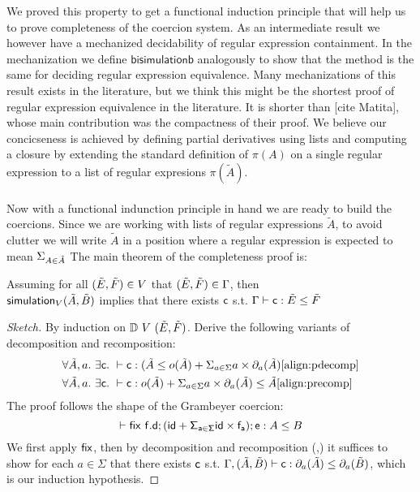 We proved this property to get a functional induction principle that will help us to prove completeness of the coercion system. As an intermediate result we however have a mechanized decidability of regular expression containment. In the mechanization we define $\mathsf{bisimulationb}$ analogously to show that the method is the same for deciding regular expression equivalence. Many mechanizations of this result exists in the literature, but we think this might be the shortest proof of regular expression equivalence in the literature. It is shorter than [cite Matita], whose main contribution was the compactness of their proof. We believe our concicseness is achieved by defining partial derivatives using lists and computing a closure by extending the standard definition of $\pi(A)$ on a single regular expression to a list of regular expresions $\pi(\tilde{A})$.\\\\
Now with a functional indunction principle in hand we are ready to build the coercions. Since we are working with lists of regular expressions $\tilde{A}$, to avoid clutter we will write $\tilde{A}$ in a position where a regular expression is expected to mean $\Sigma_{A \in \tilde{A}}$ The main theorem of the completeness proof is:
\begin{theorem}
Assuming for all $(\tilde{E},\tilde{F}) \in V$ that $(\tilde{E},\tilde{F}) \in \Gamma$, then\\
$\mathsf{simulation}_{V}(\tilde{A},\tilde{B})$ implies that there exists $\mathsf{c}$ s.t. $\Gamma \vdash \mathsf{c} : \tilde{E} \leq \tilde{F}$
\end{theorem}
\begin{proof}[Sketch]
By induction on $\mathbb{D}~{V}~(\tilde{E},\tilde{F})$. Derive the following variants of decomposition and recomposition:
\begin{align}
&\forall \tilde{A},a.~\exists \mathsf{c}.~\vdash \mathsf{c} : (\tilde{A} \leq o(\tilde{A}) + \Sigma_{a \in \Sigma} a \times \partial_{a}(\tilde{A}) \ref{align:pdecomp}\\
&\forall \tilde{A},a.~\exists \mathsf{c}.~\vdash \mathsf{c} : o(\tilde{A}) + \Sigma_{a \in \Sigma} a \times \partial_{a}(\tilde{A}) \leq \tilde{A} \ref{align:precomp}
\end{align}
The proof follows the shape of the Grambeyer coercion:
\[\vdash \mathsf{\mathsf{fix} ~f.d;(id + \Sigma_{a \in \Sigma} id\times f_a); e} : A \leq B\]
We first apply $\mathsf{fix}$, then by decomposition and recomposition (\label{align:pdecomp},\label{align:precomp}) it suffices to show for each $a \in \Sigma$ that there exists $\mathsf{c}$ s.t. $\Gamma,(\tilde{A},\tilde{B}) \vdash \mathsf{c} : \partial_{a}(\tilde{A}) \leq \partial_{a}(\tilde{B})$, which is our induction hypothesis.
\end{proof}
